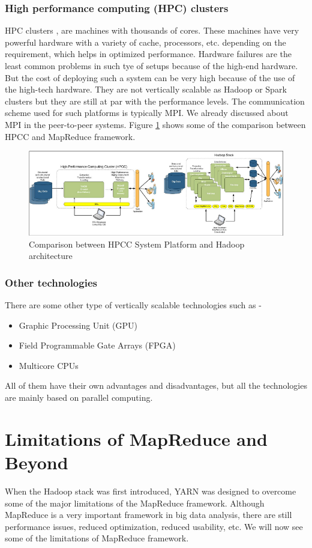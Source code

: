 \documentclass[journal]{IEEEtran}
\begin{document}
\subsubsection{\textbf{High performance computing (HPC) clusters}}
HPC clusters \cite{buyya1999high}, are machines with thousands of cores. These machines have very powerful hardware with a variety of cache, processors, etc. depending on the requirement, which helps in optimized performance. Hardware failures are the least common problems in such tye of setups because of the high-end hardware. But the cost of deploying such a system can be very high because of the use of the high-tech hardware. They are not vertically scalable as Hadoop or Spark clusters but they are still at par with the performance levels. The communication scheme used for such platforms is typically MPI. We already discussed about MPI in the peer-to-peer systems. Figure \ref{hpcccomp} shows some of the comparison between HPCC and MapReduce framework.
\begin{figure}[!ht]
  \includegraphics[width=\textwidth]{Selection_039.png}
  \caption{Comparison between HPCC System Platform and Hadoop architecture \cite{hpcc}}
  \label{hpcccomp}
\end{figure}

\subsubsection{\textbf{Other technologies}}
There are some other type of vertically scalable technologies such as -
\begin{itemize}
\item Graphic Processing Unit (GPU)
\item Field Programmable Gate Arrays (FPGA)
\item Multicore CPUs
\end{itemize}
All of them have their own advantages and disadvantages, but all the technologies are mainly based on parallel computing.

\section{Limitations of MapReduce and Beyond}
When the Hadoop stack was first introduced, YARN was designed to overcome some of the major limitations of the MapReduce framework. Although MapReduce is a very important framework in big data analysis, there are still performance issues, reduced optimization, reduced usability, etc. We will now see some of the limitations of MapReduce framework. \cite{kalavri2013mapreduce}
\end{document}
